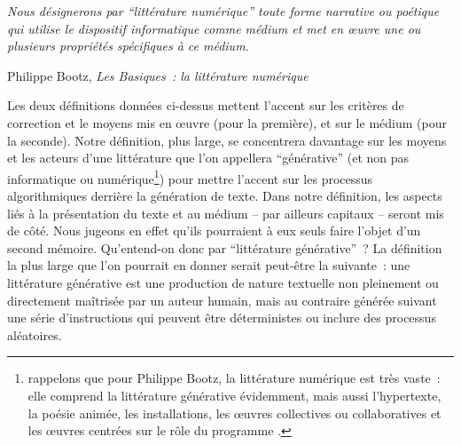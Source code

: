 \documentclass{article}
\newenvironment{citationbox}
{\begin{center}
		\begin{minipage}{.8\textwidth}
		}
		{
		\end{minipage}	
\end{center}
}
\begin{document}
			\begin{citationbox}
				\textit{Nous désignerons par ``littérature numérique'' toute forme narrative ou poétique qui utilise le dispositif informatique comme médium et met en œuvre une ou plusieurs propriétés spécifiques à ce médium.}
				\begin{flushright}
					Philippe Bootz, \textit{Les Basiques~: la littérature numérique} \cite{bootz2006}
				\end{flushright}
			\end{citationbox}
			Les deux définitions données ci-dessus mettent l'accent sur les critères de correction et le moyens mis en œuvre (pour la première), et sur le médium (pour la seconde). Notre définition, plus large, se concentrera davantage sur les moyens et les acteurs d'une littérature que l'on appellera ``générative'' (et non pas informatique ou numérique\footnote{rappelons que pour Philippe Bootz, la littérature numérique est très vaste~: elle comprend la littérature générative évidemment, mais aussi l’hypertexte, la poésie animée, les installations, les œuvres collectives ou collaboratives et les œuvres centrées sur le rôle du programme \cite{bootz2006}.}) pour mettre l'accent sur les processus algorithmiques derrière la génération de texte. Dans notre définition, les aspects liés à la présentation du texte et au médium -- par ailleurs capitaux -- seront mis de côté. Nous jugeons en effet qu'ils pourraient à eux seuls faire l'objet d'un second mémoire.
			Qu'entend-on donc par ``littérature générative''~? La définition la plus large que l'on pourrait en donner serait peut-être la suivante~: une littérature générative est une production de nature textuelle non pleinement ou directement maîtrisée par un auteur humain, mais au contraire générée suivant une série d'instructions qui peuvent être déterministes ou inclure des processus aléatoires.\\
			
\end{document}
